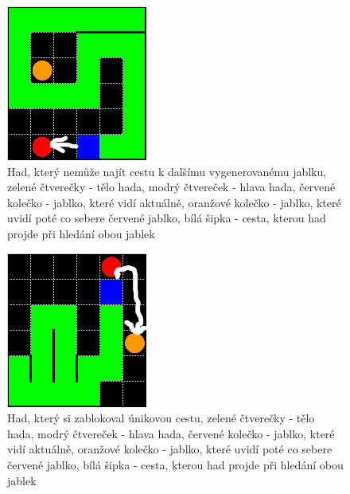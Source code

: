 \begin{figure}[h]
    \centering
    \includegraphics[width=0.4\linewidth]{Images/NoPathExistsHad.png}
    \caption{Had, který nemůže najít cestu k dalšímu vygenerovanému jablku, zelené čtverečky - tělo hada, modrý čtvereček - hlava hada, červené kolečko - jablko, které vidí aktuálně, oranžové kolečko - jablko, které uvidí poté co sebere červené jablko, bílá šipka - cesta, kterou had projde při hledání obou jablek}
    \label{fig:NoPathExistsHad}
\end{figure}

\begin{figure}[h]
    \centering
    \includegraphics[width=0.4\linewidth]{Images/OdstrihnutiCestyHad.png}
    \caption{Had, který si zablokoval únikovou cestu, zelené čtverečky - tělo hada, modrý čtvereček - hlava hada, červené kolečko - jablko, které vidí aktuálně, oranžové kolečko - jablko, které uvidí poté co sebere červené jablko, bílá šipka - cesta, kterou had projde při hledání obou jablek}
    \label{fig:OdstrihnutiCestyHad}
\end{figure}